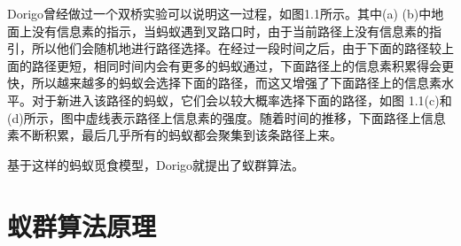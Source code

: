 \documentclass[a4paper,12pt]{report}
\begin{document}
\begin{spacing}{1.5}
	Dorigo曾经做过一个双桥实验可以说明这一过程，如图1.1所示。其中(a) (b)中地面上没有信息素的指示，当蚂蚁遇到叉路口时，由于当前路径上没有信息素的指引，所以他们会随机地进行路径选择。在经过一段时间之后，由于下面的路径较上面的路径更短，相同时间内会有更多的蚂蚁通过，下面路径上的信息素积累得会更快，所以越来越多的蚂蚁会选择下面的路径，而这又增强了下面路径上的信息素水平。对于新进入该路径的蚂蚁，它们会以较大概率选择下面的路径，如图 1.1(c)和(d)所示，图中虚线表示路径上信息素的强度。随着时间的推移，下面路径上信息素不断积累，最后几乎所有的蚂蚁都会聚集到该条路径上来。

	基于这样的蚂蚁觅食模型，Dorigo就提出了蚁群算法。

\end{spacing}



\chapter{蚁群算法原理}

\pagestyle{fancy}
\end{document}
